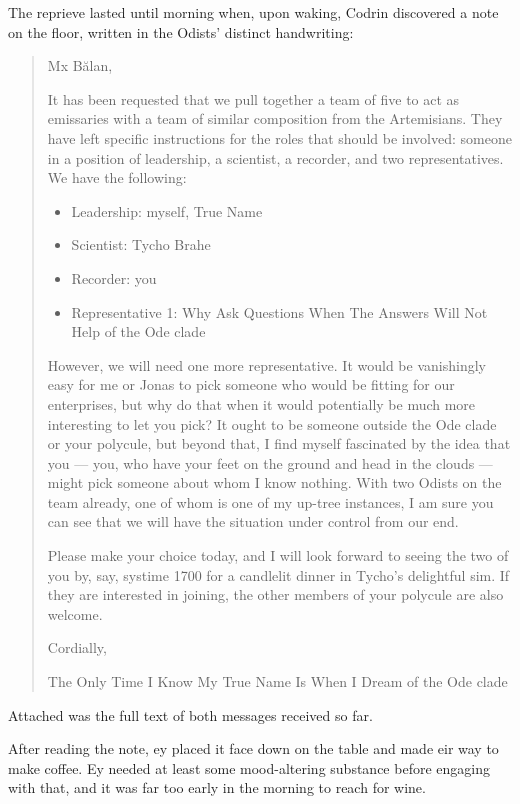 The reprieve lasted until morning when, upon waking, Codrin discovered a note on the floor, written in the Odists' distinct handwriting:

\begin{quote}
Mx Bălan,

It has been requested that we pull together a team of five to act as emissaries with a team of similar composition from the Artemisians. They have left specific instructions for the roles that should be involved: someone in a position of leadership, a scientist, a recorder, and two representatives. We have the following:

\begin{itemize}
\tightlist
\item
  Leadership: myself, True Name
\item
  Scientist: Tycho Brahe
\item
  Recorder: you
\item
  Representative 1: Why Ask Questions When The Answers Will Not Help of the Ode clade
\end{itemize}

However, we will need one more representative. It would be vanishingly easy for me or Jonas to pick someone who would be fitting for our enterprises, but why do that when it would potentially be much more interesting to let you pick? It ought to be someone outside the Ode clade or your polycule, but beyond that, I find myself fascinated by the idea that you — you, who have your feet on the ground and head in the clouds — might pick someone about whom I know nothing. With two Odists on the team already, one of whom is one of my up-tree instances, I am sure you can see that we will have the situation under control from our end.

Please make your choice today, and I will look forward to seeing the two of you by, say, systime 1700 for a candlelit dinner in Tycho's delightful sim. If they are interested in joining, the other members of your polycule are also welcome.

Cordially,

The Only Time I Know My True Name Is When I Dream of the Ode clade
\end{quote}

Attached was the full text of both messages received so far.

After reading the note, ey placed it face down on the table and made eir way to make coffee. Ey needed at least some mood-altering substance before engaging with that, and it was far too early in the morning to reach for wine.

